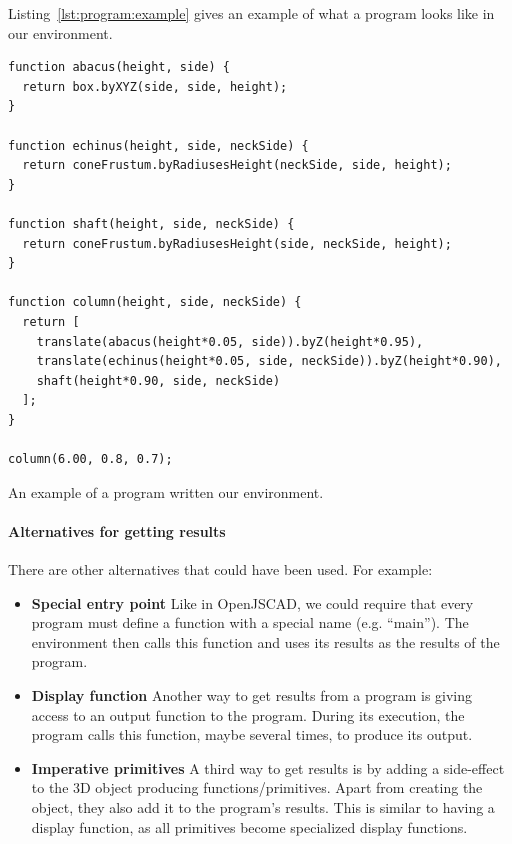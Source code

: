 Listing~\ref{lst:program:example} gives an example of what a program looks like in our environment.

\begin{listing}
\begin{verbatim}
function abacus(height, side) {
  return box.byXYZ(side, side, height);
}

function echinus(height, side, neckSide) {
  return coneFrustum.byRadiusesHeight(neckSide, side, height);
}

function shaft(height, side, neckSide) {
  return coneFrustum.byRadiusesHeight(side, neckSide, height);
}

function column(height, side, neckSide) {
  return [
    translate(abacus(height*0.05, side)).byZ(height*0.95),
    translate(echinus(height*0.05, side, neckSide)).byZ(height*0.90),
    shaft(height*0.90, side, neckSide)
  ];
}

column(6.00, 0.8, 0.7);
\end{verbatim}
\caption{An example of a program written our environment.}
\label{lst:program:example}
\end{listing}


\paragraph{Alternatives for getting results}
There are other alternatives that could have been used.
For example:
\begin{itemize}
  \item {\bf Special entry point} Like in OpenJSCAD, we could require that every program must define a function with a special name (e.g. ``main''). The environment then calls this function and uses its results as the results of the program.
  \item {\bf Display function} Another way to get results from a program is giving access to an output function to the program. During its execution, the program calls this function, maybe several times, to produce its output.
  \item {\bf Imperative primitives} A third way to get results is by adding a side-effect to the 3D object producing functions/primitives. Apart from creating the object, they also add it to the program's results. This is similar to having a display function, as all primitives become specialized display functions.
\end{itemize}


